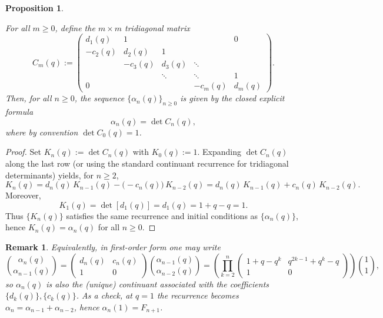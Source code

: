\documentclass[letterpaper,12pt]{article}
\newtheorem{proposition}{Proposition}
\newtheorem{remark}{Remark}
\begin{document}
\begin{proposition}\label{prop:an-determinant}

For all $m\geq 0$, define the $m\times m$ tridiagonal matrix
\begin{equation}\label{eq:MatriX}
    C_m(q):=
\begin{pmatrix}
d_1(q) & 1      &        &        & 0\\
-c_2(q)& d_2(q) & 1      &        &  \\
       & -c_3(q)& d_3(q) & \ddots &  \\
       &        & \ddots & \ddots & 1\\
0      &        &        & -c_m(q)& d_m(q)
\end{pmatrix}.
\end{equation}
Then, for all $n\geq0$,  the  sequence $\{\alpha_n(q)\}_{n\ge 0}$ 
is given by the closed explicit formula
\begin{equation}
    \alpha_n(q)=\det C_n(q),
\end{equation}
where by convention $\det C_0(q)=1$.
\end{proposition}

\begin{proof}
Set $K_n(q):=\det C_n(q)$ with $K_0(q):=1$. Expanding $\det C_n(q)$ along the last row
(or using the standard continuant recurrence for tridiagonal determinants) yields, for $n\ge 2$,
\[
K_n(q)=d_n(q)\,K_{n-1}(q)-\bigl(-c_n(q)\bigr)\,K_{n-2}(q)
      =d_n(q)\,K_{n-1}(q)+c_n(q)\,K_{n-2}(q).
\]
Moreover,
\[
K_1(q)=\det[d_1(q)]=d_1(q)=1+q-q=1.
\]
Thus $\{K_n(q)\}$ satisfies the same recurrence and initial conditions as $\{\alpha_n(q)\}$, hence
$K_n(q)=\alpha_n(q)$ for all $n\ge 0$.
\end{proof}

\begin{remark}
Equivalently, in first-order form one may write
\[
\binom{\alpha_n(q)}{\alpha_{n-1}(q)}
=
\begin{pmatrix}
d_n(q) & c_n(q)\\
1      & 0
\end{pmatrix}
\binom{\alpha_{n-1}(q)}{\alpha_{n-2}(q)}
=
\left(\prod_{k=2}^n
\begin{pmatrix}
1+q-q^k & q^{2k-1}+q^k-q\\
1 & 0
\end{pmatrix}\right)\binom{1}{1},
\]
so $\alpha_n(q)$ is also the (unique) continuant associated with the coefficients
$\{d_k(q)\},\{c_k(q)\}$.
As a check, at $q=1$ the recurrence becomes $\alpha_n=\alpha_{n-1}+\alpha_{n-2}$, hence
$\alpha_n(1)=F_{n+1}$.
\end{remark}
\end{document}
